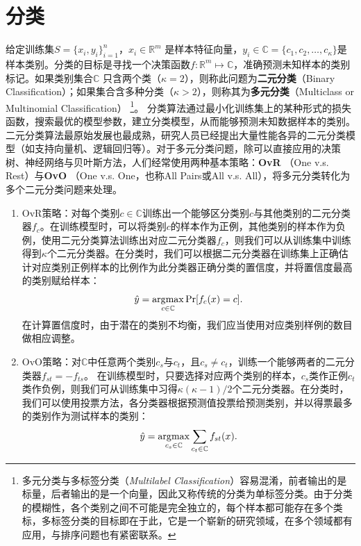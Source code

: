 \chapter{分类}
给定训练集$S=\{x_i,y_i\}_{i=1}^n$，$x_i\in \mathbb R^m$ 是样本特征向量，$y_i\in \mathbb C = \{c_1, c_2, \ldots, c_\kappa\}$是样本类别。分类的目标是寻找一个决策函数$f:\mathbb R^m \mapsto \mathbb C$，准确预测未知样本的类别标记。如果类别集合$\mathbb C$ 只含两个类（$\kappa=2$），则称此问题为\textbf{二元分类}（Binary Classification）；如果集合含多种分类（$\kappa>2$），则称其为\textbf{多元分类}（Multiclass or Multinomial Classification）
\footnote{多元分类与多标签分类（\textit{Multilabel Classification}）\cite{tsoumakas2007multi}容易混淆，前者输出的是标量，后者输出的是一个向量，因此又称传统的分类为单标签分类。由于分类的模糊性，各个类别之间不可能是完全独立的，每个样本都可能存在多个类标，多标签分类的目标即在于此，它是一个崭新的研究领域，在多个领域都有应用，与排序问题也有紧密联系。}。
分类算法通过最小化训练集上的某种形式的损失函数，搜索最优的模型参数，建立分类模型，从而能够预测未知数据样本的类别。二元分类算法最原始发展也最成熟，研究人员已经提出大量性能各异的二元分类模型（如支持向量机、逻辑回归等）。对于多元分类问题，除可以直接应用的决策树、神经网络与贝叶斯方法，人们经常使用两种基本策略：\textbf{OvR} （One v.s. Rest）与\textbf{OvO} （One v.s. One，也称All Pairs或All v.s. All），将多元分类转化为多个二元分类问题来处理。
\begin{enumerate}
  \item OvR策略：对每个类别$c\in \mathbb C$训练出一个能够区分类别$c$与其他类别的二元分类器$f_c$。在训练模型时，可以将类别$c$的样本作为正例，其他类别的样本作为负例，使用二元分类算法训练出对应二元分类器$f_c$，则我们可以从训练集中训练得到$\kappa$个二元分类器。在分类时，我们可以根据二元分类器在训练集上正确估计对应类别正例样本的比例作为此分类器正确分类的置信度，并将置信度最高的类别赋给样本：
      \[
        \hat y = \operatorname*{\mathrm{\arg\!\max}}\limits_{c\in \mathbb C} \text{Pr}[f_c(x)=c].
      \]
  在计算置信度时，由于潜在的类别不均衡，我们应当使用对应类别样例的数目做相应调整。
  \item OvO策略：对$\mathbb C$中任意两个类别$c_s$与$c_t$，且$c_s\ne c_t$，训练一个能够两者的二元分类器$f_{st}=-f_{ts}$。 在训练模型时，只要选择对应两个类别的样本，$c_s$类作正例$c_t$类作负例，则我们可从训练集中习得$\kappa(\kappa-1)/2$个二元分类器。在分类时，我们可以使用投票方法，各分类器根据预测值投票给预测类别，并以得票最多的类别作为测试样本的类别：
      \[
        \hat y = \operatorname*{\mathrm{\arg\!\max}}\limits_{c_s\in \mathbb C} \sum\limits_{c_t\in \mathbb C} f_{st}(x).
      \]
\end{enumerate}

